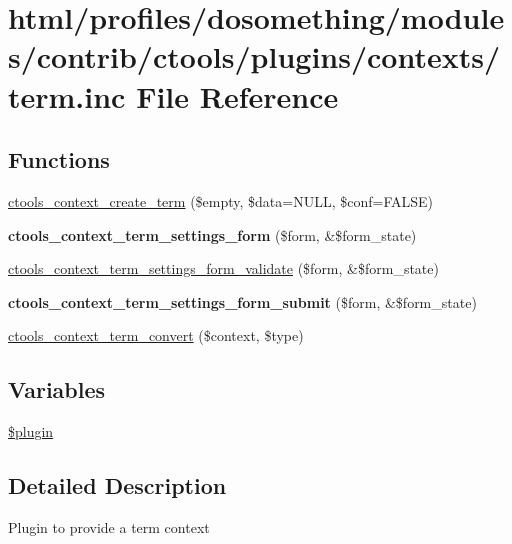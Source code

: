 \hypertarget{contexts_2term_8inc}{
\section{html/profiles/dosomething/modules/contrib/ctools/plugins/contexts/term.inc File Reference}
\label{contexts_2term_8inc}
}
\subsection*{Functions}
\begin{DoxyCompactItemize}
\item 
\hyperlink{contexts_2term_8inc_a687904b87d69e56ea41aeb94a7f56eaf}{ctools\_\-context\_\-create\_\-term} (\$empty, \$data=NULL, \$conf=FALSE)
\item 
\hypertarget{contexts_2term_8inc_a422bd50b0a877b6320eee9cbf894621d}{
{\bfseries ctools\_\-context\_\-term\_\-settings\_\-form} (\$form, \&\$form\_\-state)}
\label{contexts_2term_8inc_a422bd50b0a877b6320eee9cbf894621d}

\item 
\hyperlink{contexts_2term_8inc_a6d959df67d6875af2d0e98098375ac92}{ctools\_\-context\_\-term\_\-settings\_\-form\_\-validate} (\$form, \&\$form\_\-state)
\item 
\hypertarget{contexts_2term_8inc_ad38049177058c140d9bb79c40f3d785d}{
{\bfseries ctools\_\-context\_\-term\_\-settings\_\-form\_\-submit} (\$form, \&\$form\_\-state)}
\label{contexts_2term_8inc_ad38049177058c140d9bb79c40f3d785d}

\item 
\hyperlink{contexts_2term_8inc_a5ce57bd056a6a2b577fd612fae21b04f}{ctools\_\-context\_\-term\_\-convert} (\$context, \$type)
\end{DoxyCompactItemize}
\subsection*{Variables}
\begin{DoxyCompactItemize}
\item 
\hyperlink{contexts_2term_8inc_ada8a7130088351710bb02ed622d6bf65}{\$plugin}
\end{DoxyCompactItemize}


\subsection{Detailed Description}
Plugin to provide a term context 

